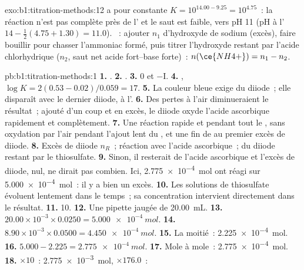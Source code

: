 \begin{solution}{exo:b1:titration-methods:12}
 a pour constante $K = 10^{14.00 - 9.25} = 10^{4.75}$~: la
réaction n'est pas complète près de l' et le saut est faible,
vers pH 11 (pH à l' $14 - \frac12(4.75 + 1.30) = 11.0$).
~: ajouter $n_1$ d'hydroxyde de sodium (excès), faire
bouillir pour chasser l'ammoniac formé, puis titrer l'hydroxyde restant
par l'acide chlorhydrique ($n_2$, saut net acide fort--base forte)~:
$n(\ce{NH4+}) = n_1 - n_2$.
\end{solution}

\begin{solution}{pb:b1:titration-methods:1}
\textbf{1.} .
\textbf{2.} .
\textbf{3.} 0 et $-$I.
\textbf{4.} , $\log K = 2(0.53 - 0.02)/0.059
= 17$.
\textbf{5.} La couleur bleue exige du diiode~; elle disparaît avec le
dernier diiode, à l'.
\textbf{6.} Des pertes à l'air diminueraient le résultat~; ajouté d'un
coup et en excès, le diiode oxyde l'acide ascorbique rapidement et
complètement.
\textbf{7.} Une réaction rapide et  pendant tout le
, sans oxydation par l'air pendant l'ajout lent du , et une fin de  au premier excès de diiode.
\textbf{8.} Excès de diiode $n_R$~; réaction avec l'acide ascorbique~;
 du diiode restant par le thiosulfate.
\textbf{9.} Sinon, il resterait de l'acide ascorbique et l'excès de
diiode, nul, ne dirait pas combien. Ici, \qty{2.775e-4}{mol} ont réagi
sur \qty{5.000e-4}{mol}~: il y a bien un excès.
\textbf{10.} Les solutions de thiosulfate évoluent lentement dans le
temps~; sa concentration intervient directement dans le résultat.
\textbf{11.} 10.
\textbf{12.} Une pipette jaugée de \qty{20.00}{mL}.
\textbf{13.} $20.00 \times 10^{-3} \times 0.0250 = \qty{5.000e-4}{mol}$.
\textbf{14.} $8.90 \times 10^{-3} \times 0.0500 = \qty{4.450e-4}{mol}$.
\textbf{15.} La moitié~: \qty{2.225e-4}{mol}.
\textbf{16.} $5.000 - 2.225 = \qty{2.775e-4}{mol}$.
\textbf{17.} Mole à mole~: \qty{2.775e-4}{mol}.
\textbf{18.} $\times 10$~: \qty{2.775e-3}{mol}, $\times 176.0$~:

\end{solution}
